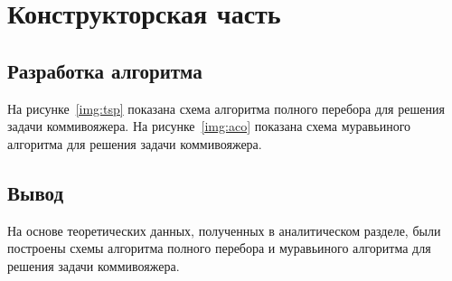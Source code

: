 \chapter{Конструкторская часть}

\section*{Разработка алгоритма}

На рисунке~\ref{img:tsp} показана схема алгоритма полного перебора для решения задачи коммивояжера.
На рисунке~\ref{img:aco} показана схема муравьиного алгоритма для решения задачи коммивояжера.

\section*{Вывод}

На основе теоретических данных, полученных в аналитическом разделе, были построены схемы алгоритма полного перебора и муравьиного алгоритма для решения задачи коммивояжера.